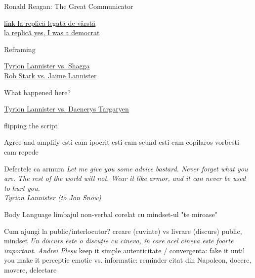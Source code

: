 \documentclass{beamer}
\begin{document}
\begin{frame}{Ronald Reagan: The Great Communicator}
  \begin{center}
    \scriptsize
    \url{link la replică legată de vârstă}\\
    \url{la replică yes, I was a democrat}
  \end{center}
\end{frame}

\begin{frame}{Reframing}
  \begin{center}
    \scriptsize
    \url{Tyrion Lannister vs. Shagga}\\
    \url{Rob Stark vs. Jaime Lannister}
  \end{center}
\end{frame}

\begin{frame}{What happened here?}
  \begin{center}
    \scriptsize
    \url{Tyrion Lannister vs. Daenerys Targaryen}
  \end{center}
  flipping the script
\end{frame}

\begin{frame}{Agree and amplify}
  esti cam ipocrit
  esti cam scund
  esti cam copilaros
  vorbesti cam repede
\end{frame}

\begin{frame}{Defectele ca armura}
  \centering
  \textit{Let me give you some advice bastard. Never forget what you are. The rest of the world will not. Wear it like armor, and it can never be used to hurt you.}\\
  \vspace{3mm}
  \hfill \textit{Tyrion Lannister (to Jon Snow)}
\end{frame}

\begin{frame}{Body Language}
  limbajul non-verbal
  corelat cu mindset-ul
  "te miroase"
\end{frame}

\begin{frame}{Cum ajungi la public/interlocutor?}
  creare (cuvinte) vs livrare (discurs)
  public, mindset
  \centering
  \textit{Un discurs este o discuție cu cineva, în care acel cineva este foarte important.}
  \vspace{3mm}
  \hfill \textit{Andrei Pleșu}
  keep it simple
  autenticitate / convergenta: fake it until you make it
  perceptie
  emotie vs. informatie: reminder citat din Napoleon, docere, movere, delectare
\end{frame}
\end{document}

